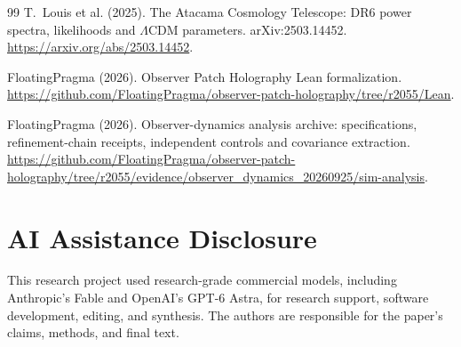 \documentclass[11pt]{article}
\theoremstyle{remark}
\theoremstyle{plain}
\begin{document}
\begin{thebibliography}{99}
T.~Louis et al. (2025). The Atacama Cosmology Telescope: DR6 power spectra,
likelihoods and \(\Lambda\)CDM parameters. arXiv:2503.14452.
\url{https://arxiv.org/abs/2503.14452}.

FloatingPragma (2026). Observer Patch Holography Lean formalization.
\url{https://github.com/FloatingPragma/observer-patch-holography/tree/r2055/Lean}.

FloatingPragma (2026). Observer-dynamics analysis archive: specifications,
refinement-chain receipts, independent controls and covariance extraction.
\url{https://github.com/FloatingPragma/observer-patch-holography/tree/r2055/evidence/observer_dynamics_20260925/sim-analysis}.

\end{thebibliography}

\section*{AI Assistance Disclosure}
This research project used research-grade commercial models, including
Anthropic's Fable and OpenAI's GPT-6 Astra, for research support, software
development, editing, and synthesis. The authors are responsible for the
paper's claims, methods, and final text.
\end{document}
